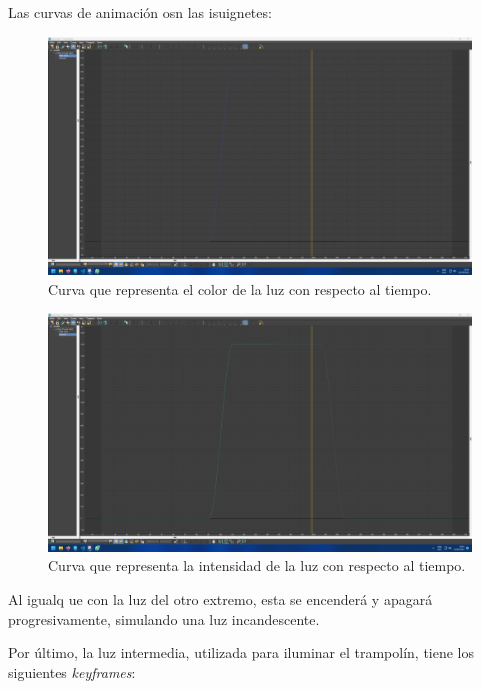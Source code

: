 \documentclass{article}
\begin{document}
Las curvas de animación osn las isuignetes:

\begin{figure}[H]
    \centering
    \includegraphics[width=\textwidth]{imagenes/curvas/LR/filter.png}
    \caption{Curva que representa el color de la luz con respecto al tiempo.}
 \end{figure}

 \begin{figure}[H]
    \centering
    \includegraphics[width=\textwidth]{imagenes/curvas/LR/intensity.png}
    \caption{Curva que representa la intensidad de la luz con respecto al tiempo.}
 \end{figure}

Al igualq ue con la luz del otro extremo, esta se encenderá y apagará progresivamente, simulando una luz incandescente.


Por último, la luz intermedia, utilizada para iluminar el trampolín, tiene los siguientes \textit{keyframes}:
\end{document}

